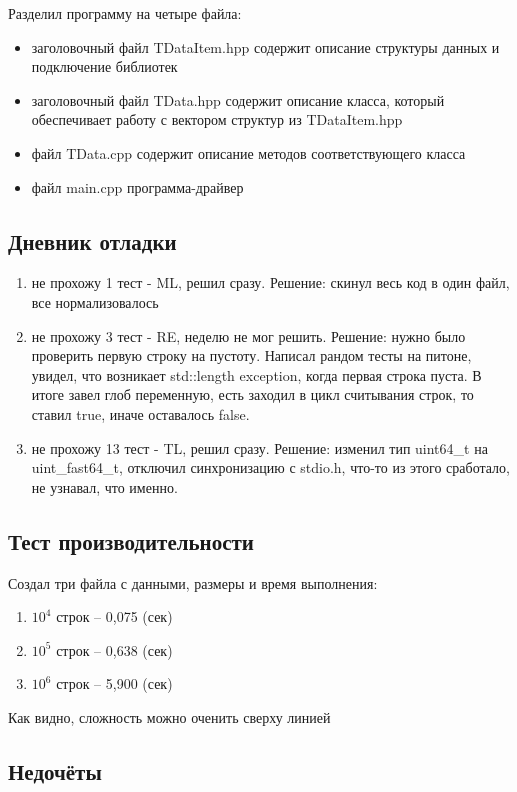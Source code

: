 \documentclass[12pt]{article}
\begin{document}
Разделил программу на четыре файла:
\begin{itemize}
    \item заголовочный файл TDataItem.hpp содержит описание структуры данных и подключение библиотек
    \item заголовочный файл TData.hpp содержит описание класса, который обеспечивает работу с вектором структур из TDataItem.hpp
    \item файл TData.cpp содержит описание методов соответствующего класса
    \item файл main.cpp программа-драйвер
\end{itemize}

\subsection*{Дневник отладки}
\begin{enumerate}
    \item не прохожу 1 тест  - ML, решил сразу. Решение: скинул весь код в один файл, все нормализовалось
    \item не прохожу 3 тест  - RE, неделю не мог решить. Решение: нужно было проверить первую строку на пустоту. Написал рандом тесты на питоне, увидел, что возникает std::length exception, когда первая строка пуста. В итоге завел глоб переменную, есть заходил в цикл считывания строк, то ставил true, иначе оставалось false.
    \item не прохожу 13 тест - TL, решил сразу. Решение: изменил тип uint64\_t на uint\_fast64\_t, отключил синхронизацию с stdio.h, что-то из этого сработало, не узнавал, что именно.
\end{enumerate}


\subsection*{Тест производительности}

Создал три файла с данными, размеры и время выполнения:
\begin{enumerate}
    \item $10^4$ строк -- 0,075 (сек) 
    \item $10^5$ строк -- 0,638 (сек)
    \item $10^6$ строк -- 5,900 (сек)
\end{enumerate}
Как видно, сложность можно оченить сверху линией

\subsection*{Недочёты}
\end{document}
